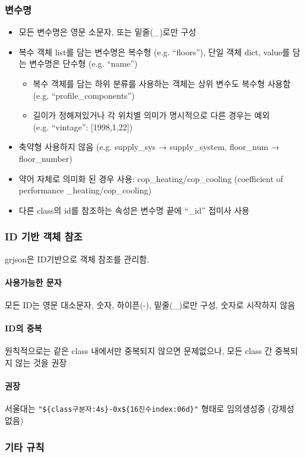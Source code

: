 \subsubsection{변수명}
\begin{itemize}
  \item 모든 변수명은 영문 소문자, 또는 밑줄(\_)로만 구성
  \item 복수 객체 list를 담는 변수명은 복수형 (e.g. “floors”), 단일 객체 dict, value를 담는 변수명은 단수형 (e.g. “name”)
  \begin{itemize}
    \item 복수 객체를 담는 하위 분류를 사용하는 객체는 상위 변수도 복수형 사용함\\
    (e.g. “profile\_components”)
    \item 길이가 정해져있거나 각 위치별 의미가 명시적으로 다른 경우는 예외\\
    (e.g. “vintage”: [1998,1,22])
  \end{itemize}
  \item 축약형 사용하지 않음 (e.g. supply\_sys → supply\_system, floor\_num → floor\_number)
  \item 약어 자체로 의미화 된 경우 사용: cop\_heating/cop\_cooling (coefficient of performance \_heating/cop\_cooling)
  \item 다른 class의 id를 참조하는 속성은 변수명 끝에 “\_id” 접미사 사용
\end{itemize}

\subsubsection{ID 기반 객체 참조}
grjson은 ID기반으로 객체 참조를 관리함.
\paragraph{사용가능한 문자} 모든 ID는 영문 대소문자, 숫자, 하이픈(-), 밑줄(\_)로만 구성, 숫자로 시작하지 않음
\paragraph{ID의 중복} 원칙적으로는 같은 class 내에서만 중복되지 않으면 문제없으나, 모든 class 간 중복되지 않는 것을 권장
\paragraph{권장} 서울대는 \verb|"${class구분자:4s}-0x${16진수index:06d}"| 형태로 임의생성중 (강제성 없음)

\subsubsection{기타 규칙}

